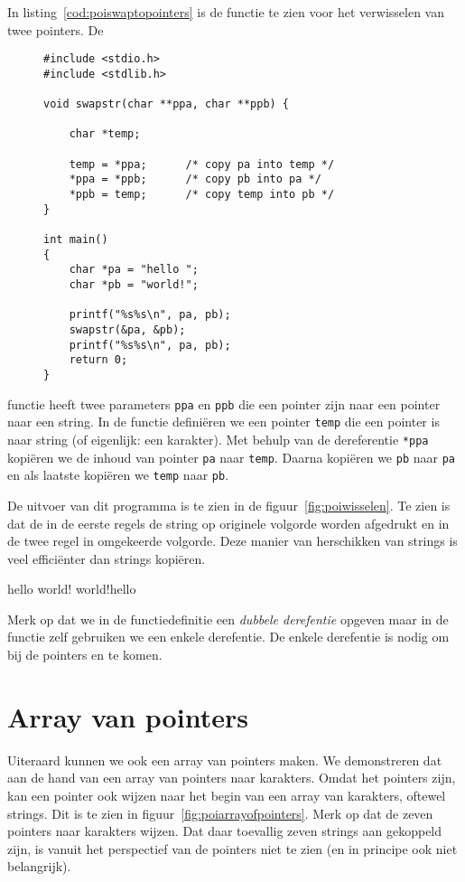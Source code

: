 In listing~\ref{cod:poiswaptopointers} is de functie te zien voor het verwisselen van twee pointers. De 
\begin{figure}[!b]
\begin{lstlisting}[caption=Functie voor het verwisselen van twee pointers.,label=cod:poiswaptopointers]
#include <stdio.h>
#include <stdlib.h>

void swapstr(char **ppa, char **ppb) {

	char *temp;

    temp = *ppa;      /* copy pa into temp */
    *ppa = *ppb;      /* copy pb into pa */
    *ppb = temp;      /* copy temp into pb */
}

int main()
{
    char *pa = "hello ";
    char *pb = "world!";

    printf("%s%s\n", pa, pb);
    swapstr(&pa, &pb);
    printf("%s%s\n", pa, pb);
    return 0;
}
\end{lstlisting}
\end{figure}
functie heeft twee parameters \texttt{ppa} en \texttt{ppb} die een pointer zijn naar een pointer naar een string. In de functie definiëren we een pointer \texttt{temp} die een pointer is naar string (of eigenlijk: een karakter). Met behulp van de dereferentie \texttt{*ppa} kopiëren we de inhoud van pointer \texttt{pa} naar \texttt{temp}. Daarna kopiëren we \texttt{pb} naar \texttt{pa} en als laatste kopiëren we \texttt{temp} naar \texttt{pb}.

De uitvoer van dit programma is te zien in de figuur~\ref{fig:poiwisselen}. Te zien is dat de in de eerste regels de string op originele volgorde worden afgedrukt en in de twee regel in omgekeerde volgorde. Deze manier van herschikken van strings is veel efficiënter dan strings kopiëren.

\begin{dosbox}[title=Verwisselen van twee stings.,label=fig:poiwisselen]
hello world!
world!hello
\end{dosbox}

Merk op dat we in de functiedefinitie een \textsl{dubbele derefentie} opgeven maar in de functie zelf gebruiken we een enkele derefentie. De enkele derefentie is nodig om bij de pointers  en  te komen.


\section{Array van pointers}
Uiteraard kunnen we ook een array van pointers maken. We demonstreren dat aan de hand van een array van pointers naar karakters. Omdat het pointers zijn, kan een pointer ook wijzen naar het begin van een array van karakters, oftewel strings. Dit is te zien in figuur~\ref{fig:poiarrayofpointers}. Merk op dat de zeven pointers naar karakters wijzen. Dat daar toevallig zeven strings aan gekoppeld zijn, is vanuit het perspectief van de pointers niet te zien (en in principe ook niet belangrijk).

